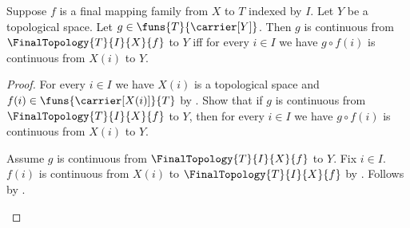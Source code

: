 \begin{theorem}\label{final_topology_universal_property}
    Suppose $f$ is a final mapping family from $X$ to $T$ indexed by $I$.
    Let $Y$ be a topological space.
    Let $g\in\funs{T}{\carrier[Y]}$.
    Then $g$ is continuous from $\FinalTopology{T}{I}{X}{f}$ to $Y$ iff
        for every $i\in I$ we have
            $g\circ f(i)$ is continuous from $X(i)$ to $Y$.
\end{theorem}
\begin{proof}
    For every $i\in I$ we have $X(i)$ is a topological space and
        $f(i)\in\funs{\carrier[X(i)]}{T}$ by
        .
    Show that if $g$ is continuous from $\FinalTopology{T}{I}{X}{f}$
        to $Y$, then for every $i\in I$ we have
        $g\circ f(i)$ is continuous from $X(i)$ to $Y$.
    \begin{subproof}
        Assume $g$ is continuous from $\FinalTopology{T}{I}{X}{f}$ to $Y$.
        Fix $i\in I$.
        $f(i)$ is continuous from $X(i)$ to
            $\FinalTopology{T}{I}{X}{f}$ by
            .
        Follows by .
    \end{subproof}


\end{proof}
